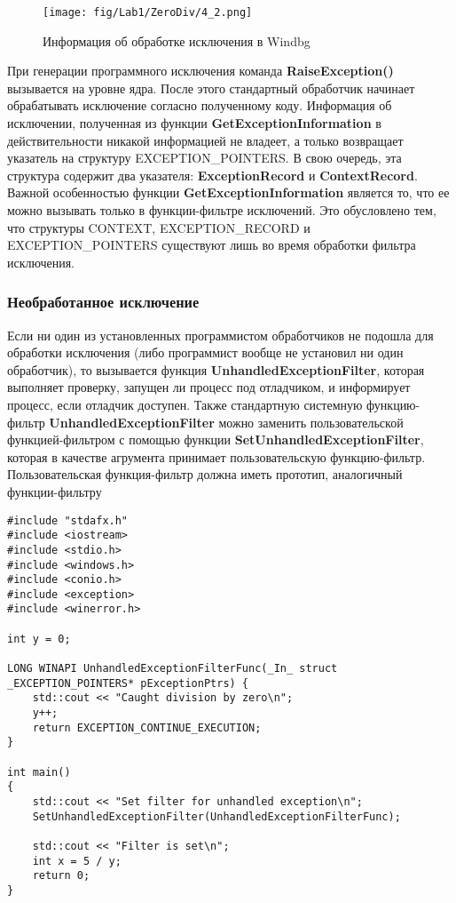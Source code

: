 \begin{figure}[H]
    \begin{center}
        \texttt{[image: fig/Lab1/ZeroDiv/4\_2.png]}
        \caption{Информация об обработке исключения в Windbg}
        \label{pic:4_2}
    \end{center}
\end{figure}

При генерации программного исключения команда \textbf{RaiseException()} вызывается на уровне ядра.
После этого стандартный обработчик начинает обрабатывать исключение согласно полученному коду.
Информация об исключении, полученная из функции \textbf{GetExceptionInformation} в действительности никакой информацией не владеет, а только возвращает указатель на структуру EXCEPTION\_POINTERS. В свою очередь, эта структура содержит два указателя: \textbf{ExceptionRecord} и \textbf{ContextRecord}.
Важной особенностью функции \textbf{GetExceptionInformation} является то, что ее можно вызывать только в функции-фильтре исключений.
Это обусловлено тем, что структуры CONTEXT, EXCEPTION\_RECORD и EXCEPTION\_POINTERS существуют лишь во время обработки фильтра исключения.

\subsubsection{Необработанное исключение}
Если ни один из установленных программистом обработчиков не подошла для обработки исключения (либо программист вообще не установил ни один обработчик), то вызывается функция \textbf{UnhandledExceptionFilter}, которая выполняет проверку, запущен ли процесс под отладчиком, и информирует процесс, если отладчик доступен. Также стандартную системную функцию-фильтр \textbf{UnhandledExceptionFilter} можно заменить пользовательской функцией-фильтром с помощью функции \textbf{SetUnhandledExceptionFilter}, которая в качестве агрумента принимает пользовательскую функцию-фильтр. Пользовательская функция-фильтр должна иметь прототип, аналогичный функции-фильтру
\begin{lstlisting}[caption=Необработанное исключение]
#include "stdafx.h"
#include <iostream>
#include <stdio.h>
#include <windows.h>
#include <conio.h>
#include <exception>
#include <winerror.h>

int y = 0;

LONG WINAPI UnhandledExceptionFilterFunc(_In_ struct _EXCEPTION_POINTERS* pExceptionPtrs) {
    std::cout << "Caught division by zero\n";
    y++;
    return EXCEPTION_CONTINUE_EXECUTION;
}

int main()
{
    std::cout << "Set filter for unhandled exception\n";
    SetUnhandledExceptionFilter(UnhandledExceptionFilterFunc);

    std::cout << "Filter is set\n";
    int x = 5 / y;
    return 0;
}
\end{lstlisting}

